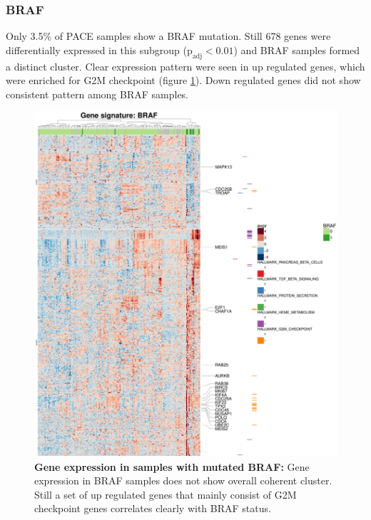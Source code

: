 \FloatBarrier

\subsubsection{BRAF}
Only 3.5\% of PACE samples show a BRAF mutation. Still 678 genes were differentially expressed in this subgroup ($\text{p}_\text{adj} < 0.01$) and BRAF samples formed a distinct cluster. Clear expression pattern were seen in up regulated genes, which were enriched for G2M checkpoint (figure \ref{fig:gene_exprBRAF_gsea_Hallmark}). Down regulated genes did not show consistent pattern among BRAF samples.  

\FloatBarrier

\begin{figure}
	\centering
	\includegraphics[width=\columnwidth]{./Figures/gene_exprBRAF_gsea_Hallmark.pdf}
	\caption{\textbf{Gene expression in samples with mutated BRAF:} Gene expression in BRAF samples does not show overall coherent cluster. Still a set of up regulated genes that mainly consist of G2M checkpoint genes correlates clearly with BRAF status.}
	\label{fig:gene_exprBRAF_gsea_Hallmark}
\end{figure}

